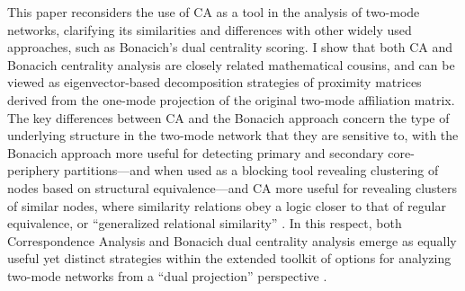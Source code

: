 \documentclass[a4paper,fleqn]{cas-sc}
\begin{document}
This paper reconsiders the use of CA as a tool in the analysis of two-mode networks, clarifying its similarities and differences with other widely used approaches, such as Bonacich's \citeyearpar{bonacich1991simultaneous} dual centrality scoring. I show that both CA and Bonacich centrality analysis are closely related mathematical cousins, and can be viewed as eigenvector-based decomposition strategies of proximity matrices derived from the one-mode projection of the original two-mode affiliation matrix. The key differences between CA and the Bonacich approach concern the type of underlying structure in the two-mode network that they are sensitive to, with the Bonacich approach more useful for detecting primary and secondary core-periphery partitions---and when used as a blocking tool revealing clustering of nodes based on structural equivalence---and CA more useful for revealing clusters of similar nodes, where similarity relations obey a logic closer to that of regular equivalence, or ``generalized relational similarity'' \citep{kovacs2010generalized}. In this respect, both Correspondence Analysis and Bonacich dual centrality analysis emerge as equally useful yet distinct strategies within the extended toolkit of options for analyzing two-mode networks from a ``dual projection'' perspective \citep{everett2013dual}. 
\end{document}
